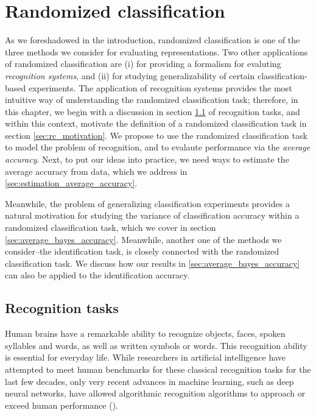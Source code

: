 
\chapter{Randomized classification} %

\label{Chapter2} %

As we foreshadowed in the introduction, randomized classification is
one of the three methods we consider for evaluating
representations.  Two other applications of randomized
classification are (i) for providing a formalism for evaluting
\emph{recognition systems}, and (ii) for studying generalizability of
certain classification-based experiments.  The application of
recognition systems provides the most intuitive way of understanding
the randomized classification task; therefore, in this chapter, we
begin with a discussion in section \ref{sec:recog_tasks} of
recognition tasks, and within this context, motivate the definition of
a randomized classification task in section \ref{sec:rc_motivation}.
We propose to use the randomized classification task to model the
problem of recognition, and to evalaute performance via the
\emph{average accuracy}.  Next, to put our ideas into practice, we
need ways to estimate the average accuracy from data, which we address
in \ref{sec:estimation_average_accuracy}.

Meanwhile, the problem of generalizing classification experiments
provides a natural motivation for studying the variance of
classification accuracy within a randomized classification task, which
we cover in section \ref{sec:average_bayes_accuracy}.  Meanwhile,
another one of the methods we consider--the identification task, is
closely connected with the randomized classification task.  We discuss
how our results in \ref{sec:average_bayes_accuracy} can also be
applied to the identification accuracy.

\section{Recognition tasks}\label{sec:recog_tasks}

Human brains have a remarkable ability to recognize objects, faces,
spoken syllables and words, as well as written symbols or words. This
recognition ability is essential for everyday life.  While researchers
in artificial intelligence have attempted to meet human benchmarks for
these classical recognition tasks for the last few decades, only very
recent advances in machine learning, such as deep neural networks,
have allowed algorithmic recognition algorithms to approach or exceed
human performance (\cite{lecun2015deep}).

